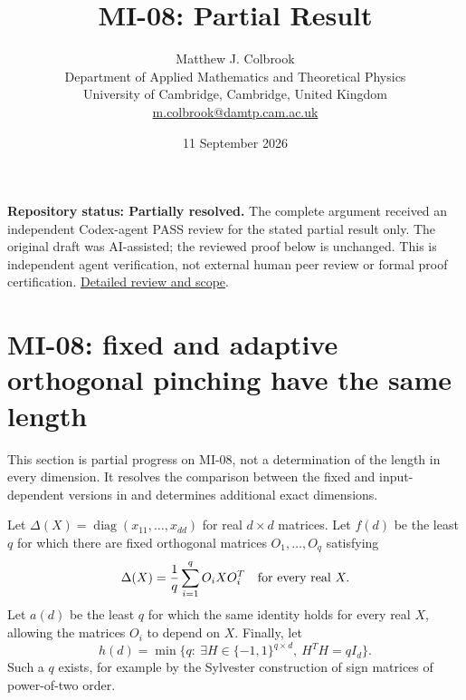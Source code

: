 \documentclass[10pt,a4paper]{article}
\title{MI-08: Partial Result}
\author{Matthew J. Colbrook\\
\small Department of Applied Mathematics and Theoretical Physics\\
\small University of Cambridge, Cambridge, United Kingdom\\
\small\href{mailto:m.colbrook@damtp.cam.ac.uk}{m.colbrook@damtp.cam.ac.uk}}
\date{11 September 2026}
\theoremstyle{remark}
\newcommand{\diag}{\operatorname{diag}}
\begin{document}
\maketitle
\textbf{Repository status: Partially resolved.}
The complete argument received an independent Codex-agent PASS review
for the stated partial result only.
The original draft was AI-assisted; the reviewed proof below is unchanged.
This is independent agent verification, not external human peer review or
formal proof certification. \href{https://github.com/ajt60gaibb/OpenProblemsInNLA/blob/main/references/colbrook-matrix-2026-09-11/verification/reviews/MI-08-review.md}{Detailed review and scope}.
\par\medskip
\section{MI-08: fixed and adaptive orthogonal pinching have the same length}
\label{sec:mi08}
This section is partial progress on MI-08, not a determination of the length in every dimension. It resolves the comparison between the fixed and input-dependent versions in \cite[Questions 4.8--4.9]{BL2026} and determines additional exact dimensions.

Let $\Delta(X)=\diag(x_{11},\ldots,x_{dd})$ for real $d\times d$ matrices. Let $f(d)$ be the least $q$ for which there are fixed orthogonal matrices $O_1,\ldots,O_q$ satisfying
\[
 \Delta(X)=\frac1q\sum_{i=1}^qO_iXO_i^T\quad\hbox{for every real }X.
\]
Let $a(d)$ be the least $q$ for which the same identity holds for every real $X$, allowing the matrices $O_i$ to depend on $X$. Finally, let
\[
 h(d)=\min\{q:\ \exists H\in\{-1,1\}^{q\times d},\ H^TH=qI_d\}.
\]
Such a $q$ exists, for example by the Sylvester construction of sign matrices of power-of-two order.
\end{document}
